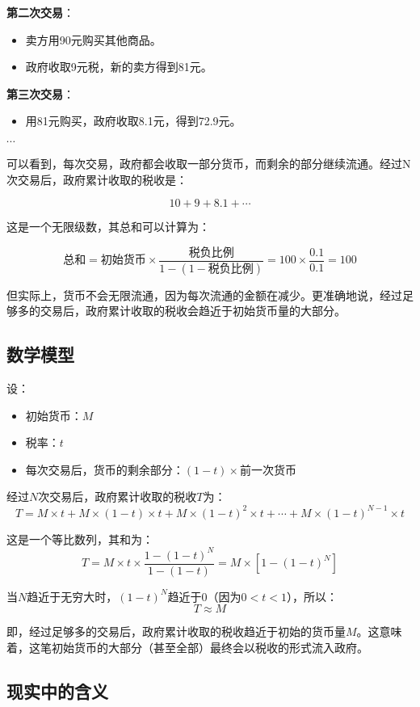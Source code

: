 \textbf{第二次交易}：
\begin{itemize}[nosep]
    \item 卖方用90元购买其他商品。
    \item 政府收取9元税，新的卖方得到81元。
\end{itemize}

\textbf{第三次交易}：
\begin{itemize}[nosep]
    \item 用81元购买，政府收取8.1元，得到72.9元。
\end{itemize}

$\cdots$

可以看到，每次交易，政府都会收取一部分货币，而剩余的部分继续流通。经过N次交易后，政府累计收取的税收是：

$$10 + 9 + 8.1 + \cdots$$

这是一个无限级数，其总和可以计算为：

$$  \text{总和} = \text{初始货币} \times \frac{\text{税负比例}}{1 - (1 - \text{税负比例})}  = 100 \times \frac{0.1}{0.1} = 100  $$

但实际上，货币不会无限流通，因为每次流通的金额在减少。更准确地说，经过足够多的交易后，政府累计收取的税收会趋近于初始货币量的大部分。

\subsection{数学模型}

设：
\begin{itemize}[nosep]
    \item 初始货币：$M$
    \item 税率：$t$
    \item 每次交易后，货币的剩余部分：$(1 - t) \times \text{前一次货币}$
\end{itemize}

经过$N$次交易后，政府累计收取的税收$T$为：
$$ T = M \times t + M \times (1 - t) \times t + M \times (1 - t)^2 \times t + \cdots + M \times (1 - t)^{N-1} \times t $$

这是一个等比数列，其和为：
$$ T = M \times t \times \frac{1 - (1 - t)^N}{1 - (1 - t)} = M \times \left[1 - (1 - t)^N\right] $$

当$N$趋近于无穷大时，$(1 - t)^N$趋近于0（因为$0 < t < 1$），所以：
$$ T \approx M $$

即，经过足够多的交易后，政府累计收取的税收趋近于初始的货币量$M$。这意味着，这笔初始货币的大部分（甚至全部）最终会以税收的形式流入政府。

\subsection{现实中的含义}

